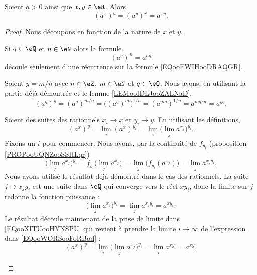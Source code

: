 \begin{proposition}     \label{PROPooDWZKooNwXsdV}
	Soient \( a>0\) ainsi que \( x,y\in \eR\). Alors
	\begin{equation}
		(a^x)^y=(a^y)^x=a^{xy}.
	\end{equation}
\end{proposition}

\begin{proof}
	Nous découpons en fonction de la nature de \( x\) et \( y\).

	\begin{subproof}
		Si \( q\in \eQ\) et \( n\in \eN\) alors la formule
		\begin{equation}
			(a^q)^n=a^{nq}
		\end{equation}
		découle seulement d'une récurrence sur la formule \ref{EQooEWIHooDRAQGR}.

		\spitem[ \( x,y\in \eQ\)]
		Soient \( y=m/n\) avec \( n\in \eZ\), \( m\in \eN\) et \( q\in \eQ\). Nous avons, en utilisant la partie déjà démontrée et le lemme \ref{LEMooIDLJooZALNaD},
		\begin{equation}
			(a^q)^{y}=(a^q)^{m/n}=\big( (a^q)^m \big)^{1/n}=(a^{mq})^{1/n}=a^{mq/n}=a^{yq}.
		\end{equation}
		\spitem[\( x,y\) irrationnels]

		Soient des suites des rationnels \( x_i\to x\) et \( y_i\to y\). En utilisant les définitions,
		\begin{equation}        \label{EQooXITUooHYNSPU}
			(a^x)^y=\lim_i(a^x)^{y_i}=\lim_i\big( \lim_j a^{x_j} \big)^{y_i}.
		\end{equation}
		Fixons un \(i\) pour commencer. Nous avons, par la continuité de \( f_{y_i}\) (proposition \ref{PROPooUQNZooSSHLqr})
		\begin{equation}
			\big( \lim_ja^{x_j} \big)^{y_i}=f_{y_i}\big( \lim_ja^{x_j} \big)=\lim_j\big( f_{y_i}(a^{x_j}) \big)=\lim_ja^{x_jy_i}.
		\end{equation}
		Nous avons utilisé le résultat déjà démontré dans le cas des rationnels. La suite \( j\mapsto x_jy_i\) est une suite dans \( \eQ\) qui converge vers le réel \( xy_i\), donc la limite sur \( j\) redonne la fonction puissance :
		\begin{equation}        \label{EQooWORSooFoRBod}
			\big( \lim_ja^{x_j} \big)^{y_i}=\lim_ja^{x_jy_i}=a^{xy_i}.
		\end{equation}
		Le résultat découle maintenant de la prise de limite dans \eqref{EQooXITUooHYNSPU} qui revient à prendre la limite \( i\to \infty\) de l'expression dans \eqref{EQooWORSooFoRBod} :
		\begin{equation}
			(a^x)^y=\lim_i\big( \lim_j a^{x_j} \big)^{y_i}=\lim_ia^{xy_i}=a^{xy}.
		\end{equation}
	\end{subproof}
\end{proof}


